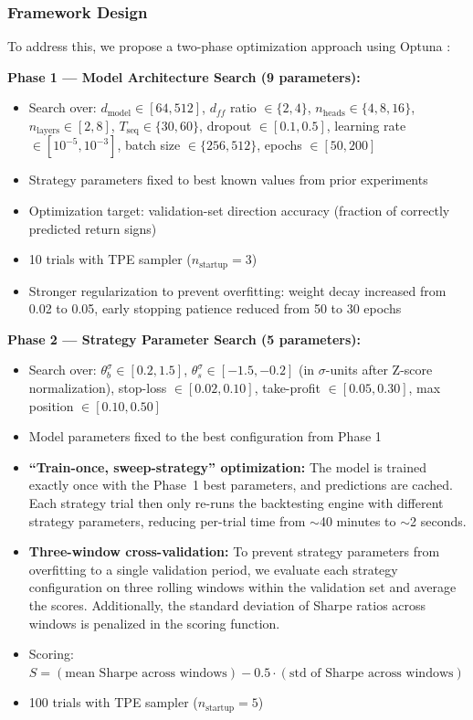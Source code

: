 \documentclass[12pt, a4paper]{article}
\begin{document}
\subsubsection{Framework Design}

To address this, we propose a two-phase optimization approach using Optuna \citep{akiba2019optuna}:

\textbf{Phase 1 --- Model Architecture Search (9 parameters):}
\begin{itemize}[leftmargin=2em]
    \item Search over: $d_{\text{model}} \in [64, 512]$, $d_{ff}$ ratio $\in \{2, 4\}$, $n_{\text{heads}} \in \{4, 8, 16\}$, $n_{\text{layers}} \in [2, 8]$, $T_{\text{seq}} \in \{30, 60\}$, dropout $\in [0.1, 0.5]$, learning rate $\in [10^{-5}, 10^{-3}]$, batch size $\in \{256, 512\}$, epochs $\in [50, 200]$
    \item Strategy parameters fixed to best known values from prior experiments
    \item Optimization target: validation-set direction accuracy (fraction of correctly predicted return signs)
    \item 10 trials with TPE sampler ($n_{\text{startup}} = 3$)
    \item Stronger regularization to prevent overfitting: weight decay increased from 0.02 to 0.05, early stopping patience reduced from 50 to 30 epochs
\end{itemize}

\textbf{Phase 2 --- Strategy Parameter Search (5 parameters):}
\begin{itemize}[leftmargin=2em]
    \item Search over: $\theta_b^\sigma \in [0.2, 1.5]$, $\theta_s^\sigma \in [-1.5, -0.2]$ (in $\sigma$-units after Z-score normalization), stop-loss $\in [0.02, 0.10]$, take-profit $\in [0.05, 0.30]$, max position $\in [0.10, 0.50]$
    \item Model parameters fixed to the best configuration from Phase 1
    \item \textbf{``Train-once, sweep-strategy'' optimization:} The model is trained exactly once with the Phase~1 best parameters, and predictions are cached. Each strategy trial then only re-runs the backtesting engine with different strategy parameters, reducing per-trial time from $\sim$40 minutes to $\sim$2 seconds.
    \item \textbf{Three-window cross-validation:} To prevent strategy parameters from overfitting to a single validation period, we evaluate each strategy configuration on three rolling windows within the validation set and average the scores. Additionally, the standard deviation of Sharpe ratios across windows is penalized in the scoring function.
    \item Scoring: $S = (\text{mean Sharpe across windows}) - 0.5 \cdot (\text{std of Sharpe across windows})$
    \item 100 trials with TPE sampler ($n_{\text{startup}} = 5$)
\end{itemize}
\end{document}
